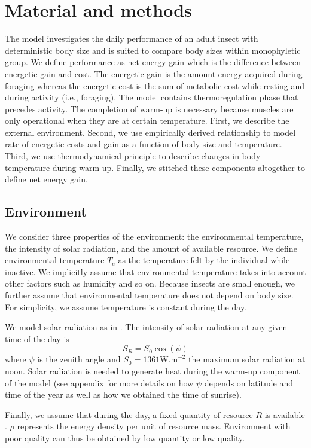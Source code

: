 \section*{Material and methods}
The model investigates the daily performance of an adult insect with deterministic body size and is suited to compare body sizes within monophyletic group.
We define performance as net energy gain which is the difference between energetic gain and cost.
The energetic gain is the amount energy acquired  during foraging whereas  the energetic cost is the sum of metabolic cost while resting and during activity (i.e., foraging).
The model contains thermoregulation phase that precedes activity.
The completion of warm-up is necessary because muscles are only operational when they are at certain temperature. 
First, we describe the external environment.
Second, we use empirically derived relationship to model rate of energetic costs and gain as a function of body size and temperature.
Third, we use thermodynamical principle to describe changes in body temperature during warm-up.
Finally, we stitched these components altogether to define net energy gain. 

\subsection*{Environment}
We consider three properties of the environment: the environmental temperature, the intensity of solar radiation, and the amount of available resource.
We define environmental temperature $T_e$ as the temperature felt by the individual while inactive.
We implicitly assume that environmental temperature takes into account other factors such as humidity and so on.
Because insects are small enough, we further assume that environmental temperature does not depend on body size.
For simplicity, we assume temperature is constant during the day.

We model solar radiation as in \citet{Campbell2012}.
The intensity of solar radiation at any given time of the day is \[S_R = S_0 \cos(\psi) \]
where $\psi$ is the zenith angle and $S_0 = 1361 \mbox{W.m}^{-2}$ the maximum solar radiation at noon.
Solar radiation is needed to generate heat during the warm-up component of the model (see appendix for more details on how $\psi$ depends on latitude and time of the year as well as how we obtained the time of sunrise).

Finally, we assume that during the day, a fixed quantity of resource $R$ is available .
$\rho$ represents the energy density per unit of resource mass. %
Environment with poor quality can thus be obtained by low quantity or low quality.


